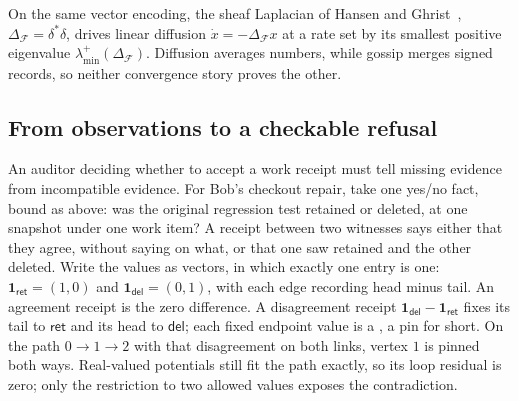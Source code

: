 \documentclass[11pt,a4paper]{article}
\theoremstyle{definition}
\theoremstyle{remark}
\begin{document}


On the same vector encoding, the sheaf Laplacian of Hansen and
Ghrist~, $\Delta_{\mathcal F}=\delta^*\delta$, drives
linear diffusion $\dot x=-\Delta_{\mathcal F}x$ at a rate set by its smallest
positive eigenvalue $\lambda^{+}_{\min}(\Delta_{\mathcal F})$. Diffusion
averages numbers, while gossip merges signed records, so neither convergence
story proves the other.

\pdexercisepointer{\ref{ex:fh-consistency-radius-run}}{\ref{ex:fh-two-liar-boundary}}{\pageref{ex:fh-consistency-radius-run}}

\subsection{From observations to a checkable refusal}\label{sec:fh-evidence-decision}

An auditor deciding whether to accept a work receipt must tell missing evidence
from incompatible evidence. For Bob's checkout repair, take one yes/no fact,
bound as above: was the original regression test retained or deleted, at one
snapshot under one work item? A receipt between two witnesses says either that
they agree, without saying on what, or that one saw retained and the other
deleted. Write the values as  vectors, in which exactly one
entry is one: $\mathbf{1}_{\mathsf{ret}}=(1,0)$ and
$\mathbf{1}_{\mathsf{del}}=(0,1)$, with each edge recording head minus tail. An
agreement receipt is the zero difference. A disagreement receipt
$\mathbf{1}_{\mathsf{del}}-\mathbf{1}_{\mathsf{ret}}$ fixes its tail to
$\mathsf{ret}$ and its head to $\mathsf{del}$; each fixed endpoint value is a
, a pin for short. On the path $0\to1\to2$ with that
disagreement on both links, vertex $1$ is pinned both ways. Real-valued
potentials still fit the path exactly, so its loop residual is zero; only the
restriction to two allowed values exposes the contradiction.
\end{document}
